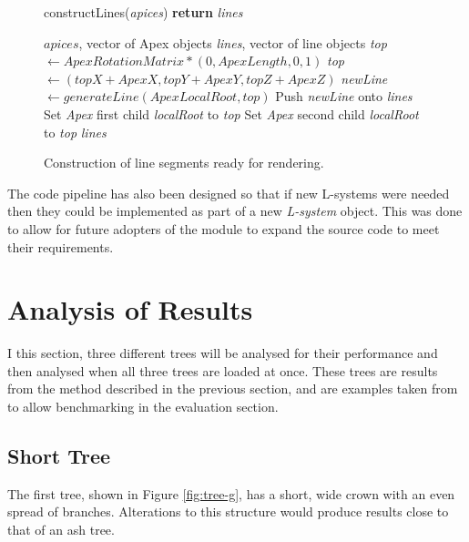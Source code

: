 \documentclass[final]{cmpreport}
\begin{document}
\begin{figure}[ht]
    \begin{algorithm}[H]
    \caption{constructLines(\emph{apices}) {\textbf{return}} \emph{lines}}
        \begin{algorithmic}[1]
        \Require $apices$, vector of Apex objects
        \Ensure \emph{lines}, vector of line objects
            \State \emph{top} $\leftarrow ApexRotationMatrix * (0, ApexLength, 0, 1)$ 
            \State \emph{top} $\leftarrow (topX + ApexX, topY + ApexY, topZ + ApexZ)$ 
            \State \emph{newLine} $\leftarrow generateLine(ApexLocalRoot, top)$ 
            \State Push \emph{newLine} onto \emph{lines}
                \State Set \emph{Apex} first child \emph{localRoot} to \emph{top}
            \EndIf
                \State Set \emph{Apex} second child \emph{localRoot} to \emph{top}
            \EndIf
        \EndFor
        \State \Return \emph{lines}
        \end{algorithmic}
    \end{algorithm}
    \caption{Construction of line segments ready for rendering.}
    \label{fig:construct-lines}
\end{figure}

The code pipeline has also been designed so that if new L-systems were needed then they could 
be implemented as part of a new \emph{L-system} object. This was done to allow for future 
adopters of the module to expand the source code to meet their requirements.

\section{Analysis of Results}
I this section, three different trees will be analysed for their performance and then analysed 
when all three trees are loaded at once. These trees are results from the method described in 
the previous section, and are examples taken from \cite{prusinkiewicz1996systems} to allow 
benchmarking in the evaluation section.

\subsection{Short Tree}
The first tree, shown in Figure \ref{fig:tree-g}, has a short, wide crown with an even spread of branches.
Alterations to this structure would produce results close to that of an ash tree. 
\end{document}
